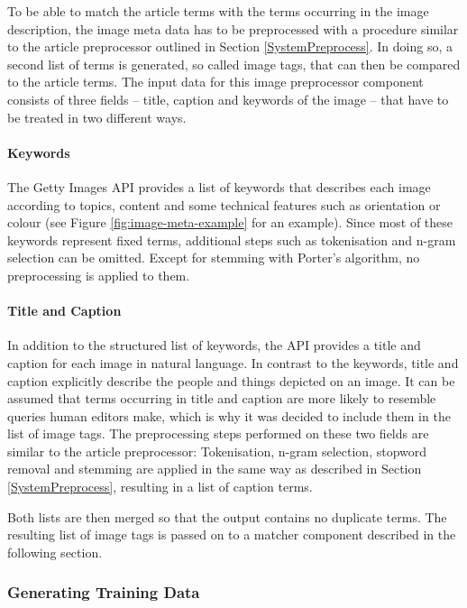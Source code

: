 \documentclass[11pt,a4paper,twoside]{article}
\begin{document}
\noindent To be able to match the article terms with the terms occurring in the image description, the image meta data has to be preprocessed with a procedure similar to the article preprocessor outlined in Section \ref{SystemPreprocess}. In doing so, a second list of terms is generated, so called image tags, that can then be compared to the article terms. The input data for this image preprocessor component consists of three fields -- title, caption and keywords of the image -- that have to be treated in two different ways.

\paragraph{Keywords} The Getty Images API provides a list of keywords that describes each image according to topics, content and some technical features such as orientation or colour (see Figure \ref{fig:image-meta-example} for an example). Since most of these keywords represent fixed terms, additional steps such as tokenisation and n-gram selection can be omitted. Except for stemming with Porter's algorithm, no preprocessing is applied to them.

\paragraph{Title and Caption} In addition to the structured list of keywords, the API provides a title and caption for each image in natural language. In contrast to the keywords, title and caption explicitly describe the people and things depicted on an image. It can be assumed that terms occurring in title and caption are more likely to resemble queries human editors make, which is why it was decided to include them in the list of image tags. The preprocessing steps performed on these two fields are similar to the article preprocessor: Tokenisation, n-gram selection, stopword removal and stemming are applied in the same way as described in Section \ref{SystemPreprocess}, resulting in a list of caption terms.

Both lists are then merged so that the output contains no duplicate terms. The resulting list of image tags is passed on to a matcher component described in the following section.

\subsubsection{Generating Training Data} \label{SystemTrainGenerate}
\end{document}

